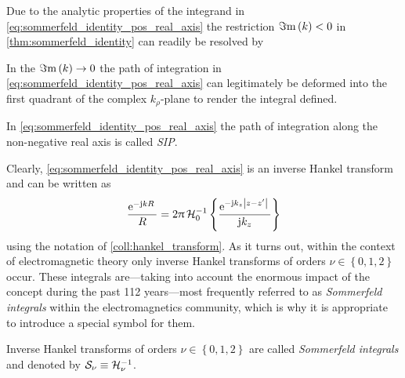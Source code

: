 Due to the analytic properties of the integrand in
\eqref{eq:sommerfeld_identity_pos_real_axis} the restriction $\Im\mathrm{m}\left(k\right) < 0$
in \cref{thm:sommerfeld_identity} can readily be resolved by
\begin{corollary}
	In the $\Im\mathrm{m}\left(k\right) \to 0$ the path of integration in
	\eqref{eq:sommerfeld_identity_pos_real_axis} can legitimately be deformed
	into the first quadrant of the complex $k_\rho$-plane to render the integral
	defined.
\end{corollary}

\begin{definition}
	In \eqref{eq:sommerfeld_identity_pos_real_axis} the path of integration
	along the non-negative real axis is called \emph{\acf{SIP}}.
\end{definition}

Clearly, \eqref{eq:sommerfeld_identity_pos_real_axis} is an inverse Hankel
transform and can be written as
\begin{equation}
		\frac{\mathrm{e}^{-\mathrm{j} k R}\,}{R} = 
		2\uppi \,
		\mathcal{H}^{-1}_{0}
		\left\{ \frac{\mathrm{e}^{-\mathrm{j} k_z \left\vert z - z^\prime\right\vert}\,}{\mathrm{j} k_z} \right\} 
\end{equation}
using the notation of \cref{coll:hankel_transform}.
As it turns out, within the context of electromagnetic theory only
inverse Hankel transforms of orders $\nu \in \left\{0, 1, 2\right\}$
occur.
These integrals are---taking into account the enormous impact of the
concept during the past 112 years---most frequently referred to as
\emph{Sommerfeld integrals} within the electromagnetics community, which is why
it is appropriate to introduce a special symbol for them.
\begin{definition}	
	Inverse Hankel transforms of orders $\nu \in \left\{0, 1, 2\right\}$
	are called \emph{Sommerfeld integrals} and denoted by
	$\mathcal{S}_{\nu} \equiv \mathcal{H}^{-1}_{\nu}$.
\end{definition}

